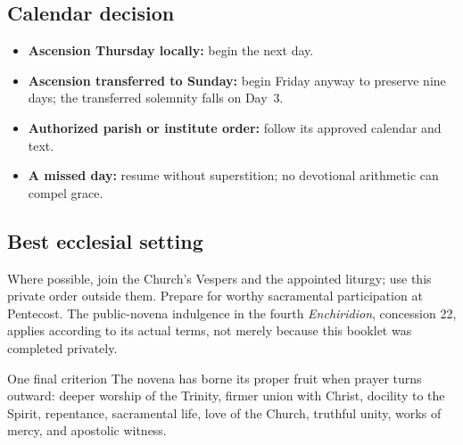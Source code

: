 \subsection*{Calendar decision}

\begin{itemize}
\item \textbf{Ascension Thursday locally:} begin the next day.
\item \textbf{Ascension transferred to Sunday:} begin Friday anyway to preserve nine days; the transferred solemnity falls on Day~3.
\item \textbf{Authorized parish or institute order:} follow its approved calendar and text.
\item \textbf{A missed day:} resume without superstition; no devotional arithmetic can compel grace.
\end{itemize}

\subsection*{Best ecclesial setting}

Where possible, join the Church's Vespers and the appointed liturgy; use this private order outside them. Prepare for worthy sacramental participation at Pentecost. The public-novena indulgence in the fourth \textit{Enchiridion}, concession 22, applies according to its actual terms, not merely because this booklet was completed privately.

\begin{studybox}{One final criterion}
The novena has borne its proper fruit when prayer turns outward: deeper worship of the Trinity, firmer union with Christ, docility to the Spirit, repentance, sacramental life, love of the Church, truthful unity, works of mercy, and apostolic witness.
\end{studybox}
